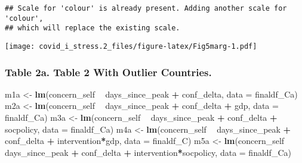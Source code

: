 \documentclass[
]{article}
\newenvironment{Shaded}{\begin{snugshade}}{\end{snugshade}}
\newcommand{\DataTypeTok}[1]{\textcolor[rgb]{0.13,0.29,0.53}{#1}}
\newcommand{\KeywordTok}[1]{\textcolor[rgb]{0.13,0.29,0.53}{\textbf{#1}}}
\newcommand{\NormalTok}[1]{#1}
\newcommand{\OperatorTok}[1]{\textcolor[rgb]{0.81,0.36,0.00}{\textbf{#1}}}
\newcommand{\StringTok}[1]{\textcolor[rgb]{0.31,0.60,0.02}{#1}}
\begin{document}
\begin{verbatim}
## Scale for 'colour' is already present. Adding another scale for 'colour',
## which will replace the existing scale.
\end{verbatim}

\texttt{[image: covid\_i\_stress.2\_files/figure-latex/Fig5marg-1.pdf]}

\hypertarget{table-2a.-table-2-with-outlier-countries.}{%
\subsubsection{Table 2a. Table 2 With Outlier
Countries.}\label{table-2a.-table-2-with-outlier-countries.}}

\begin{Shaded}
\begin{Highlighting}[]
\NormalTok{m1a <-}\StringTok{ }\KeywordTok{lm}\NormalTok{(concern_self }\OperatorTok{~}\StringTok{ }\NormalTok{days_since_peak }\OperatorTok{+}\StringTok{ }\NormalTok{conf_delta, }\DataTypeTok{data =}\NormalTok{ finaldf_Ca)}
\NormalTok{m2a <-}\StringTok{ }\KeywordTok{lm}\NormalTok{(concern_self }\OperatorTok{~}\StringTok{ }\NormalTok{days_since_peak }\OperatorTok{+}\StringTok{ }\NormalTok{conf_delta }\OperatorTok{+}\StringTok{ }\NormalTok{gdp, }\DataTypeTok{data =}\NormalTok{ finaldf_Ca)}
\NormalTok{m3a <-}\StringTok{ }\KeywordTok{lm}\NormalTok{(concern_self }\OperatorTok{~}\StringTok{ }\NormalTok{days_since_peak }\OperatorTok{+}\StringTok{ }\NormalTok{conf_delta }\OperatorTok{+}\StringTok{ }\NormalTok{socpolicy, }\DataTypeTok{data =}\NormalTok{ finaldf_Ca)}
\NormalTok{m4a <-}\StringTok{ }\KeywordTok{lm}\NormalTok{(concern_self }\OperatorTok{~}\StringTok{ }\NormalTok{days_since_peak }\OperatorTok{+}\StringTok{ }\NormalTok{conf_delta }\OperatorTok{+}\StringTok{ }\NormalTok{intervention}\OperatorTok{*}\NormalTok{gdp, }\DataTypeTok{data =}\NormalTok{ finaldf_C)}
\NormalTok{m5a <-}\StringTok{ }\KeywordTok{lm}\NormalTok{(concern_self }\OperatorTok{~}\StringTok{ }\NormalTok{days_since_peak }\OperatorTok{+}\StringTok{ }\NormalTok{conf_delta }\OperatorTok{+}\StringTok{ }\NormalTok{intervention}\OperatorTok{*}\NormalTok{socpolicy, }\DataTypeTok{data =}\NormalTok{ finaldf_Ca)}


\end{Highlighting}
\end{Shaded}
\end{document}
